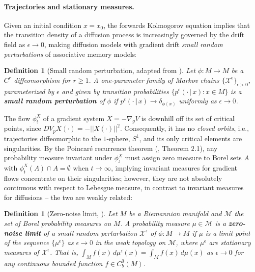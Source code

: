 \documentclass[12pt]{article}
\newtheorem{definition}[theorem]{Definition}
\begin{document}
\paragraph{Trajectories and stationary measures.} 
Given an initial condition $x = x_0$, the forwards Kolmogorov equation implies that the transition density of a diffusion process is increasingly governed by the drift field as $\epsilon \rightarrow 0$, making diffusion models with gradient drift \textit{small random perturbations} of associative memory models:

\begin{definition}[Small random perturbation, adapted from \cite{cowieson2005srb}]
\label{definition:small-random-perturbation}
    Let $\phi: M \rightarrow M$ be a $C^{r}$ diffeomorphism for $r \geq 1$. A one-parameter family of Markov chains $\{\mathcal{X}^{\epsilon}\}_{\epsilon>0}$, parameterized by $\epsilon$ and given by transition probabilities $\{p^\epsilon(\cdot \, | \, x): x \in M\}$ is a \textbf{\textit{small random perturbation}} of $\phi$ if $p^\epsilon(\cdot \, | \, x) \rightarrow \delta_{\phi(x)}$ uniformly as $\epsilon \rightarrow 0$. 
\end{definition}

The flow $\phi_t^X$ of a gradient system $X = -\nabla_g V$ is downhill off its set of critical points, since $DV_pX(\cdot) = -|| X(\cdot) ||^2$. Consequently, it has no \textit{closed orbits}, i.e., trajectories diffeomorphic to the $1$-sphere, $S^1$, and its only critical elements are singularities. By the Poincaré recurrence theorem (\cite{sinai1989dynamical}, Theorem 2.1), any probability measure invariant under $\phi_t^X$ must assign zero measure to Borel sets $A$ with $\phi^X_t(A) \cap A = \emptyset$ when $t\rightarrow \infty$, implying invariant measures for gradient flows concentrate on their singularities; however, they are not absolutely continuous with respect to Lebesgue measure, in contrast to invariant measures for diffusions -- the two are weakly related:

\begin{definition}[Zero-noise limit, \cite{cowieson2005srb}]
    Let $M$ be a Riemannian manifold and $\mathcal{M}$ the set of Borel probability measures on $M$. A probability measure $\mu \in \mathcal{M}$ is a \textbf{\textit{zero-noise limit}} of a small random perturbation $\mathcal{X}^{\epsilon}$ of $\phi: M \rightarrow M$ if $\mu$ is a limit point of the sequence $\{\mu^{\epsilon}\}$ as $\epsilon \rightarrow 0$ in the weak topology on $\mathcal{M}$, where $\mu^{\epsilon}$ are stationary measures of $\mathcal{X}^{\epsilon}$. That is, $\int_M f(x) \,d\mu^{\epsilon}(x) = \int_M f(x) \,d\mu(x)$ as $\epsilon \rightarrow 0$ for any continuous bounded function $f \in C^0_b(M)$.
\end{definition}
\end{document}
